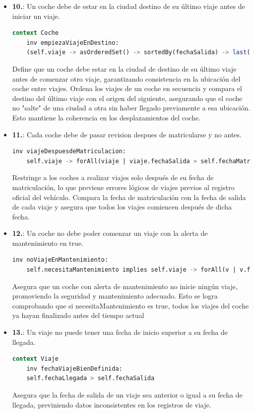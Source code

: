 \documentclass[12pt.a4paper]{article}
\begin{document}
\begin{itemize}
    \item \textbf{10.}: Un coche debe de estar en la ciudad destino de su último viaje antes de iniciar un viaje.
    \begin{lstlisting}[style = useEspecifico,language=SQL]
  context Coche
    inv empiezaViajeEnDestino:
    (self.viaje -> asOrderedSet() -> sortedBy(fechaSalida) -> last()).recorrido.destino = self.ciudad
    \end{lstlisting}
     Define que un coche debe estar en la ciudad de destino de su último viaje antes de comenzar otro viaje, garantizando consistencia en la ubicación del coche entre viajes.
     Ordena los viajes de un coche en secuencia y compara el destino del último viaje con el origen del siguiente, asegurando que el coche no "salte" de una ciudad a otra sin haber llegado previamente a esa ubicación. Esto mantiene la coherencia en los desplazamientos del coche.
     
    \item \textbf{11.}: Cada coche debe de pasar revision despues de matricularse y no antes.
    \begin{lstlisting}[style = useEspecifico,language=SQL]
    inv viajeDespuesdeMatriculacion:
    self.viaje -> forAll(viaje | viaje.fechaSalida > self.fechaMatriculacion)    
    \end{lstlisting}
    Restringe a los coches a realizar viajes solo después de su fecha de matriculación, lo que previene errores lógicos de viajes previos al registro oficial del vehículo.
    Compara la fecha de matriculación con la fecha de salida de cada viaje y asegura que todos los viajes comiencen después de dicha fecha.
    
    \item \textbf{12.}: Un coche no debe poder comenzar un viaje con la alerta de mantenimiento en true.
    \begin{lstlisting}[style = useEspecifico,language=SQL]
    inv noViajeEnMantenimiento:
    self.necesitaMantenimiento implies self.viaje -> forAll(v | v.fechaLlegada < self.clock.NOW)   
    \end{lstlisting}
    Asegura que un coche con alerta de mantenimiento no inicie ningún viaje, promoviendo la seguridad y mantenimiento adecuado.
    Esto se logra comprobando que si necesitaMantenimiento es true, todos los viajes del coche ya hayan finalizado antes del tiempo actual 
    
    \item \textbf{13.}: Un viaje no puede tener una fecha de inicio superior a su fecha de llegada.
    \begin{lstlisting}[style = useEspecifico,language=SQL]
context Viaje
    inv fechaViajeBienDefinida:
    self.fechaLlegada > self.fechaSalida  
    \end{lstlisting}
    Asegura que la fecha de salida de un viaje sea anterior o igual a su fecha de llegada, previniendo datos inconsistentes en los registros de viaje.
\end{itemize}
\end{document}
